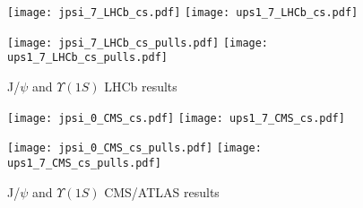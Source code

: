 \documentclass{article}
\begin{document}
\clearpage

\begin{figure}
\centering
\texttt{[image: jpsi\_7\_LHCb\_cs.pdf]}
\texttt{[image: ups1\_7\_LHCb\_cs.pdf]}

\texttt{[image: jpsi\_7\_LHCb\_cs\_pulls.pdf]}
\texttt{[image: ups1\_7\_LHCb\_cs\_pulls.pdf]}
\caption{J/$\psi$ and $\Upsilon(1S)$ LHCb results}
\end{figure}

\clearpage

\begin{figure}
\centering
\texttt{[image: jpsi\_0\_CMS\_cs.pdf]}
\texttt{[image: ups1\_7\_CMS\_cs.pdf]}

\texttt{[image: jpsi\_0\_CMS\_cs\_pulls.pdf]}
\texttt{[image: ups1\_7\_CMS\_cs\_pulls.pdf]}
\caption{J/$\psi$ and $\Upsilon(1S)$ CMS/ATLAS results}
\end{figure}

\clearpage


\end{document}
